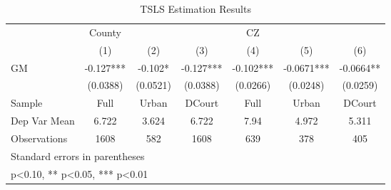 \begin{table}[htbp]\centering
\def\sym#1{\ifmmode^{#1}\else\(^{#1}\)\fi}
\caption{TSLS Estimation Results}
\begin{tabular}{l*{6}{c}}
\toprule
                    &      County   &               &               &          CZ   &               &               \\
                    &\multicolumn{1}{c}{(1)}   &\multicolumn{1}{c}{(2)}   &\multicolumn{1}{c}{(3)}   &\multicolumn{1}{c}{(4)}   &\multicolumn{1}{c}{(5)}   &\multicolumn{1}{c}{(6)}   \\
\midrule
GM                  &      -0.127***&      -0.102*  &      -0.127***&      -0.102***&     -0.0671***&     -0.0664** \\
                    &    (0.0388)   &    (0.0521)   &    (0.0388)   &    (0.0266)   &    (0.0248)   &    (0.0259)   \\
\midrule
Sample              &        Full   &       Urban   &      DCourt   &        Full   &       Urban   &      DCourt   \\
Dep Var Mean        &       6.722   &       3.624   &       6.722   &        7.94   &       4.972   &       5.311   \\
Observations        &        1608   &         582   &        1608   &         639   &         378   &         405   \\
\bottomrule
\multicolumn{7}{l}{\footnotesize Standard errors in parentheses}\\
\multicolumn{7}{l}{\footnotesize * p<0.10, ** p<0.05, *** p<0.01}\\
\end{tabular}
\end{table}
